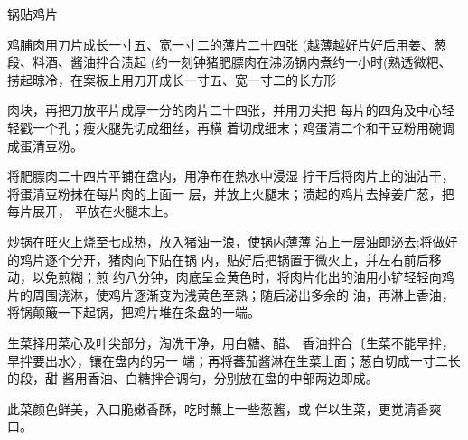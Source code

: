 \begin{recipe}{锅贴鸡片}

\ingredients


\cooking

\step 鸡脯肉用刀片成长一寸五、宽一寸二的薄片二十四张 (越薄越好片好后用姜、葱段、料酒、酱油拌合渍起 (约一刻钟猪肥膘肉在沸汤锅内煮约一小时(熟透微粑、 捞起晾冷，在案板上用刀开成长一寸五、宽一寸二的长方形

肉块，再把刀放平片成厚一分的肉片二十四张，并用刀尖把 每片的四角及中心轻轻戳一个孔；瘦火腿先切成细丝，再横 着切成细末；鸡蛋清二个和干豆粉用碗调成蛋清豆粉。

\step 	将肥膘肉二十四片平铺在盘内，用净布在热水中浸湿 拧干后将肉片上的油沾干，将蛋清豆粉抹在每片肉的上面一 层，并放上火腿末；渍起的鸡片去掉姜广葱，把每片展开， 平放在火腿末上。

\step 	炒锅在旺火上烧至七成热，放入猪油一浪，使锅内薄薄 沾上一层油即泌去;将做好的鸡片逐个分开，猪肉向下贴在锅 内，贴好后把锅置于微火上，并左右前后移动，以免煎糊；煎 约八分钟，肉底呈金黄色时，将肉片化出的油用小铲轻轻向鸡 片的周围浇淋，使鸡片逐渐变为浅黄色至熟；随后泌出多余的 油，再淋上香油，将锅颠簸一下起锅，把鸡片堆在条盘的一端。

\step 生菜择用菜心及叶尖部分，淘洗干净，用白糖、醋、 香油拌合〔生菜不能早拌，早拌要出水〉，镶在盘内的另一 端；再将蕃茄酱淋在生菜上面；葱白切成一寸二长的段，甜 酱用香油、白糖拌合调匀，分别放在盘的中部两边即成。

\notes

此菜颜色鲜美，入口脆嫩香酥，吃时蘸上一些葱酱，或 伴以生菜，更觉清香爽口。

\end{recipe}

